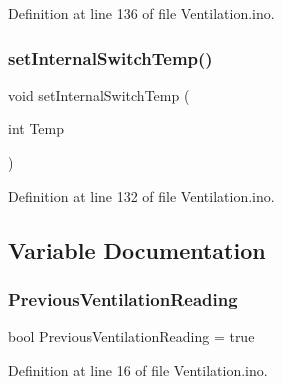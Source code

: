 Definition at line 136 of file Ventilation.\+ino.

\mbox{\label{_ventilation_8ino_a58205164752c83b6854179d44c89d29e}} 
\subsubsection{\texorpdfstring{setInternalSwitchTemp()}{setInternalSwitchTemp()}}
{\footnotesize\ttfamily void set\+Internal\+Switch\+Temp (\begin{DoxyParamCaption}\item[{int}]{Temp }\end{DoxyParamCaption})}



Definition at line 132 of file Ventilation.\+ino.



\subsection{Variable Documentation}
\mbox{\label{_ventilation_8ino_a2505d5b8aba92c783ea8743f1643abaa}} 
\subsubsection{\texorpdfstring{PreviousVentilationReading}{PreviousVentilationReading}}
{\footnotesize\ttfamily bool Previous\+Ventilation\+Reading = true}



Definition at line 16 of file Ventilation.\+ino.

